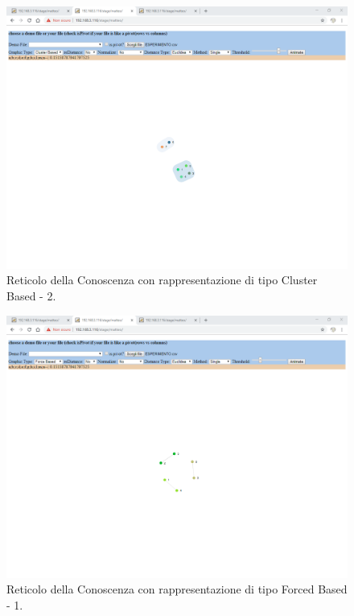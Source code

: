\begin{figure}[H]
\centering
	\includegraphics[width=1\linewidth]{./image/reticoloCorretto2.png}
	\caption{Reticolo della Conoscenza con rappresentazione di tipo Cluster Based - 2.}
	\label{Reticolo della Conoscenza con rappresentazione di tipo Cluster Based - 2.}
\end{figure}
\noindent
\begin{figure}[H]
\centering
	\includegraphics[width=1\linewidth]{./image/reticoloCorretto3.png}
	\caption{Reticolo della Conoscenza con rappresentazione di tipo Forced Based - 1.}
	\label{Reticolo della Conoscenza con rappresentazione di tipo Forced Based - 1.}
\end{figure}
